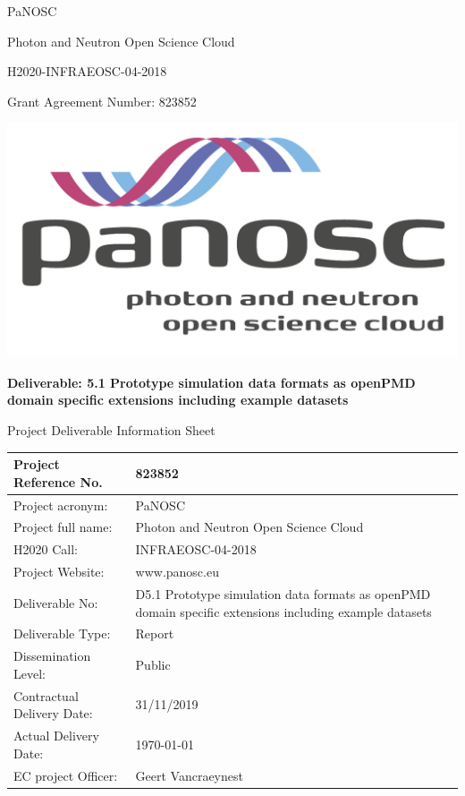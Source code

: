 \documentclass[11pt, a4paper]{report}
\begin{document}
{
	\centering
    \begin{onehalfspace}
    \sffamily
	{\LARGE PaNOSC \par}
	{\LARGE Photon and Neutron Open Science Cloud \par}
	{\LARGE H2020-INFRAEOSC-04-2018 \par}
	{\LARGE Grant Agreement Number: 823852 \par}
	\end{onehalfspace}
	
	\vfill
	\includegraphics[width=\textwidth]{PaNOSClogo_web_RGB.pdf}\par
	\vfill

	{\large \textbf{Deliverable: 5.1 Prototype simulation data formats as openPMD domain specific extensions including example datasets}}
} %
\newpage

\fancyfoot{} %
\fancyfoot[R]{\thepage}
{\sffamily\LARGE Project Deliverable Information Sheet \par}

\begin{center}
\begin{tabular}{ | m{5.2cm}| m{10.7cm} | }
\hline
Project Reference No. & 823852 \\ 
\hline
Project acronym: & PaNOSC \\ 
\hline
Project full name: & Photon and Neutron Open Science Cloud \\ 
\hline
H2020 Call: & INFRAEOSC-04-2018 \\ 
\hline
Project Website: & www.panosc.eu \\ 
\hline
Deliverable No: & D5.1 Prototype simulation data formats as openPMD domain specific extensions including example datasets \\ 
\hline
Deliverable Type: & Report \\ 
\hline
Dissemination Level: & Public \\ 
\hline
Contractual Delivery Date: & 31/11/2019 \\ 
\hline
Actual Delivery Date: & \today \\
\hline
EC project Officer: & Geert Vancraeynest \\ 
\hline
\end{tabular}
\end{center}
\end{document}
